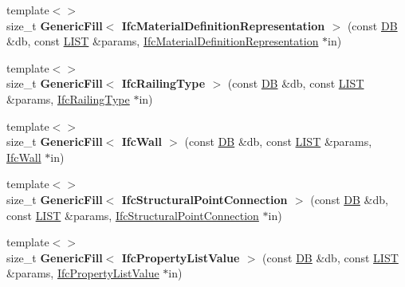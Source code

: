 \begin{DoxyCompactItemize}
\item 
\hypertarget{namespace_assimp_1_1_s_t_e_p_a85f210581ca4105d852fd74989a24abb}{{\footnotesize template$<$$>$ }\\size\+\_\+t {\bfseries Generic\+Fill$<$ Ifc\+Material\+Definition\+Representation $>$} (const \hyperlink{class_assimp_1_1_s_t_e_p_1_1_d_b}{D\+B} \&db, const \hyperlink{class_assimp_1_1_s_t_e_p_1_1_e_x_p_r_e_s_s_1_1_l_i_s_t}{L\+I\+S\+T} \&params, \hyperlink{struct_assimp_1_1_i_f_c_1_1_ifc_material_definition_representation}{Ifc\+Material\+Definition\+Representation} $\ast$in)}\label{namespace_assimp_1_1_s_t_e_p_a85f210581ca4105d852fd74989a24abb}

\item 
\hypertarget{namespace_assimp_1_1_s_t_e_p_a4056a34815a649838f850ff6ec986b8f}{{\footnotesize template$<$$>$ }\\size\+\_\+t {\bfseries Generic\+Fill$<$ Ifc\+Railing\+Type $>$} (const \hyperlink{class_assimp_1_1_s_t_e_p_1_1_d_b}{D\+B} \&db, const \hyperlink{class_assimp_1_1_s_t_e_p_1_1_e_x_p_r_e_s_s_1_1_l_i_s_t}{L\+I\+S\+T} \&params, \hyperlink{struct_assimp_1_1_i_f_c_1_1_ifc_railing_type}{Ifc\+Railing\+Type} $\ast$in)}\label{namespace_assimp_1_1_s_t_e_p_a4056a34815a649838f850ff6ec986b8f}

\item 
\hypertarget{namespace_assimp_1_1_s_t_e_p_a4f46ce8a3ce34afbb8379725fee397d9}{{\footnotesize template$<$$>$ }\\size\+\_\+t {\bfseries Generic\+Fill$<$ Ifc\+Wall $>$} (const \hyperlink{class_assimp_1_1_s_t_e_p_1_1_d_b}{D\+B} \&db, const \hyperlink{class_assimp_1_1_s_t_e_p_1_1_e_x_p_r_e_s_s_1_1_l_i_s_t}{L\+I\+S\+T} \&params, \hyperlink{struct_assimp_1_1_i_f_c_1_1_ifc_wall}{Ifc\+Wall} $\ast$in)}\label{namespace_assimp_1_1_s_t_e_p_a4f46ce8a3ce34afbb8379725fee397d9}

\item 
\hypertarget{namespace_assimp_1_1_s_t_e_p_adc9f5a7cfd51f0d233c5c1b24ad474f1}{{\footnotesize template$<$$>$ }\\size\+\_\+t {\bfseries Generic\+Fill$<$ Ifc\+Structural\+Point\+Connection $>$} (const \hyperlink{class_assimp_1_1_s_t_e_p_1_1_d_b}{D\+B} \&db, const \hyperlink{class_assimp_1_1_s_t_e_p_1_1_e_x_p_r_e_s_s_1_1_l_i_s_t}{L\+I\+S\+T} \&params, \hyperlink{struct_assimp_1_1_i_f_c_1_1_ifc_structural_point_connection}{Ifc\+Structural\+Point\+Connection} $\ast$in)}\label{namespace_assimp_1_1_s_t_e_p_adc9f5a7cfd51f0d233c5c1b24ad474f1}

\item 
\hypertarget{namespace_assimp_1_1_s_t_e_p_ac205f4644b6b1a4a8e7fb66dee3d59af}{{\footnotesize template$<$$>$ }\\size\+\_\+t {\bfseries Generic\+Fill$<$ Ifc\+Property\+List\+Value $>$} (const \hyperlink{class_assimp_1_1_s_t_e_p_1_1_d_b}{D\+B} \&db, const \hyperlink{class_assimp_1_1_s_t_e_p_1_1_e_x_p_r_e_s_s_1_1_l_i_s_t}{L\+I\+S\+T} \&params, \hyperlink{struct_assimp_1_1_i_f_c_1_1_ifc_property_list_value}{Ifc\+Property\+List\+Value} $\ast$in)}\label{namespace_assimp_1_1_s_t_e_p_ac205f4644b6b1a4a8e7fb66dee3d59af}


\end{DoxyCompactItemize}
